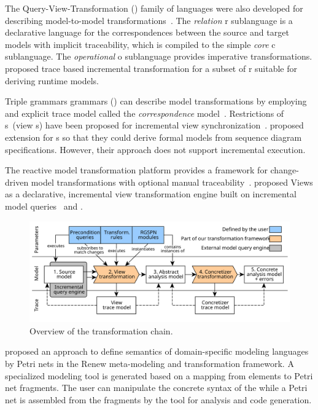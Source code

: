 The Query-View-Transformation () family of languages were also developed for describing model-to-model transformations~\citep{OMG16qvt}. The \emph{relation} r sublanguage is a declarative language for the correspondences between the source and target models with implicit traceability, which is compiled to the simple \emph{core} c sublanguage. The \emph{operational} o sublanguage provides imperative transformations. \citet{Song11incremental} proposed trace based incremental transformation for a subset of r suitable for deriving runtime models.

Triple grammars grammars () can describe model transformations by employing and explicit trace model called the \emph{correspondence} model~\citep{Schurr94tgg}. Restrictions of s~(view s) have been proposed for incremental view synchronization~\citep{Jakob06nonmaterialized,Anjorin14materialized}. \citet{Greenyer11advanced} proposed extension for s so that they could derive formal models from sequence diagram specifications. However, their approach does not support incremental execution.

The  reactive model transformation platform provides a framework for change-driven model transformations with optional manual traceability~\citep{Bergmann15viatra}. \citet{Debreceni14viewmodel} proposed  Views as a declarative, incremental view transformation engine built on incremental model queries~\citep{Ujhelyi15incquery} and .

\begin{figure}
  \centering
  \includegraphics[scale=0.9]{figures/transformation_chain}
  \caption{Overview of the transformation chain.}
  \label{fig:transform:overview}
\end{figure}

\citet{Mosteller16semantics} proposed an approach to define semantics of domain-specific modeling languages by Petri nets in the Renew meta-modeling and transformation framework. A specialized modeling tool is generated based on a mapping from  elements to Petri net fragments. The user can manipulate the concrete syntax of the  while a Petri net is assembled from the fragments by the tool for analysis and code generation.

